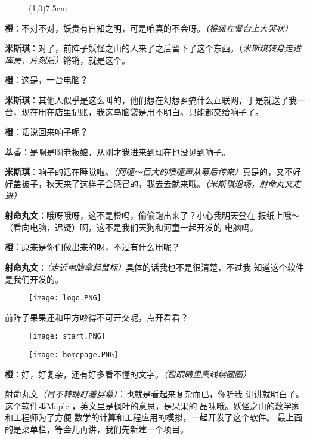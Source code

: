 \begin{figure}[htpb]
    \centering
    \line(1,0){7.5cm}\\

\end{figure}

\textbf{橙}：不对不对，妖贵有自知之明，可是咱真的不会呀。\textit{（橙瘫在餐台上大哭状）}

\textbf{米斯琪}：对了，前阵子妖怪之山的人来了之后留下了这个东西。（\textit{米斯琪转身走进库房，片刻后）}锵锵，就是这个。

\textbf{橙}：这是，一台电脑？

\textbf{米斯琪}：其他人似乎是这么叫的，他们想在幻想乡搞什么互联网，于是就送了我一台，现在用在店里记账，我这鸟脑袋是用不明白。只能都交给响子了。

\textbf{橙}：话说回来响子呢？

萃香：是啊是啊老板娘，从刚才我进来到现在也没见到响子。

\textbf{米斯琪}：响子的话在睡觉啦。\textit{（阿嚏～巨大的喷嚏声从幕后传来）}真是的，又不好好盖被子，秋天来了这样子会感冒的，我去去就来哦。\textit{（米斯琪退场，射命丸文走进）}

\textbf{射命丸文}：哦呀哦呀，这不是橙吗，偷偷跑出来了？小心我明天登在
报纸上哦～（看向电脑，迟疑）啊，这不是我们天狗和河童一起开发的
电脑吗。

\textbf{橙}：原来是你们做出来的呀，不过有什么用呢？

\textbf{射命丸文}：\textit{（走近电脑拿起鼠标）}具体的话我也不是很清楚，不过我
知道这个软件是我们开发的。
\begin{figure}[h]
    \centering
    \texttt{[image: logo.PNG]}
\end{figure}
前阵子果果还和甲方吵得不可开交呢，点开看看？

\begin{figure}[h]
    \centering
    \texttt{[image: start.PNG]}
\end{figure}

\begin{figure}[h]
    \centering
    \texttt{[image: homepage.PNG]}
\end{figure}

\textbf{橙}：好，好复杂，还有好多看不懂的文字。\textit{（橙眼睛里黑线绕圈圈）}

射命丸文\textit{（目不转睛盯着屏幕）}：也就是看起来复杂而已，你听我
讲讲就明白了。这个软件叫Maple ，英文里是枫叶的意思，是果果的
品味哦。妖怪之山的数学家和工程师为了方便
数学的计算和工程应用的模拟，一起开发了这个软件。
最上面的是菜单栏，等会儿再讲，我们先新建一个项目。

